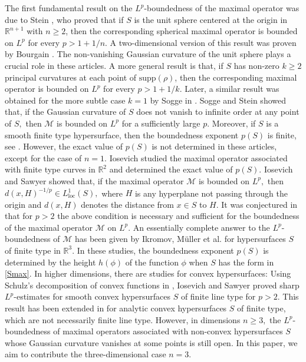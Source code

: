 \documentclass[a4paper, 11pt]{article}
\theoremstyle{plain}
\theoremstyle{definition}
\theoremstyle{lemma}
\theoremstyle{Remark}
\theoremstyle{proposition}
\theoremstyle{corollary}
\theoremstyle{example}
\theoremstyle{assumption}
\begin{document}
 The first fundamental result on the $L^p$-boundedness of the maximal operator was due to Stein \cite{Ball}, who proved that if $S$ is the unit sphere centered at the origin in $\mathbb{R}^{n+1}$ with $n \geq 2$, then the corresponding spherical maximal operator is bounded on $L^p$ for every $p > 1 + {1}/{n}$.
 A two-dimensional version of this result was proven by Bourgain \cite{Bo}.
 The non-vanishing Gaussian curvature of the unit sphere plays a crucial role in these articles.  A more general result \cite{Gr} is  that, if $S$   has non-zero $k\geq 2$ principal curvatures at each point of $\mathrm{supp}(\rho)$, then the corresponding maximal operator is bounded on $L^p$ for every $p>1+1/k.$ Later, a similar result was obtained for the more subtle  case $k=1$ by Sogge in \cite{Sogge}.  Sogge and Stein \cite{Sog.St} showed that, if the Gaussian curvature of $S$ does not vanish to infinite order  at    any point of $S,$ then $\mathcal{M}$ is bounded on $L^p$ for a sufficiently large  $p$. Moreover, if $S$ is a smooth finite type hypersurface, then the boundedness exponent $p(S)$ is finite, see \cite{I.U}.  However, the exact value of  $p(S)$ is not determined in these articles, except for the case of $n=1$.  Iosevich \cite{Io} studied the maximal operator associated with finite type curves in $\mathbb{R}^2$ and determined the exact value of $p(S)$.
 Iosevich and Sawyer \cite{Io.Saw} showed that, if the maximal operator $\mathcal{M}$ is bounded on $L^p, $ then
 $
  d(x,H)^{-1/p}\in L^{1}_{\mathrm{loc}}(S),
    $
  where $H$ is any hyperplane not passing through the origin and $d(x,H)$ denotes the distance from $x\in S$ to $H$. It was conjectured in \cite{Io.Saw}  that  for $p>2$  the above condition is necessary and sufficient for the boundedness of the maximal operator $\mathcal{M}$ on $L^p.$
 An essentially complete answer to the  $L^p$-boundedness of $\mathcal{M}$ has been given by  Ikromov, M\"uller et al. \cite{I.K.M, P1,P2} for  hypersurfaces $S$ of finite type in $\mathbb{R}^3.$  In these studies, the boundedness exponent $p(S)$ is determined by the  height $h(\phi)$  of the function $\phi$ when $S$ has the form in  \eqref{Smax}.
In higher dimensions, there are  studies for convex hypersurfaces: Using Schulz's decomposition  of convex functions in \cite{Sch},  Iosevich and Sawyer \cite{I.S} proved sharp $L^p$-estimates for  smooth convex hypersurfaces $S$ of finite line type for $p>2.$  This result has been extended in \cite{I.U}  for analytic convex hypersurfaces $S$ of finite type, which are not necessarily  finite line type. However, in dimensions $n\geq 3,$ the $L^p$-boundedness
 of maximal operators associated with non-convex hypersurfaces $S$ whose
Gaussian curvature vanishes at some points is still  open. In this paper, we aim to contribute the  three-dimensional case $n=3$.
\end{document}
